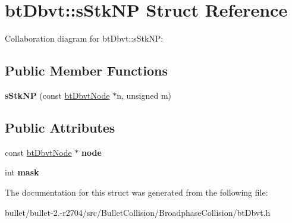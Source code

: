 \hypertarget{structbt_dbvt_1_1s_stk_n_p}{\section{bt\+Dbvt\+:\+:s\+Stk\+N\+P Struct Reference}
\label{structbt_dbvt_1_1s_stk_n_p}
}


Collaboration diagram for bt\+Dbvt\+:\+:s\+Stk\+N\+P\+:
\subsection*{Public Member Functions}
\begin{DoxyCompactItemize}
\item 
\hypertarget{structbt_dbvt_1_1s_stk_n_p_a779083781a038c4765d2380803386742}{{\bfseries s\+Stk\+N\+P} (const \hyperlink{structbt_dbvt_node}{bt\+Dbvt\+Node} $\ast$n, unsigned m)}\label{structbt_dbvt_1_1s_stk_n_p_a779083781a038c4765d2380803386742}

\end{DoxyCompactItemize}
\subsection*{Public Attributes}
\begin{DoxyCompactItemize}
\item 
\hypertarget{structbt_dbvt_1_1s_stk_n_p_a624f585fbdbe7c557c8e6d391e92c29d}{const \hyperlink{structbt_dbvt_node}{bt\+Dbvt\+Node} $\ast$ {\bfseries node}}\label{structbt_dbvt_1_1s_stk_n_p_a624f585fbdbe7c557c8e6d391e92c29d}

\item 
\hypertarget{structbt_dbvt_1_1s_stk_n_p_ae1c9afcd5531c3868cf22724da51341f}{int {\bfseries mask}}\label{structbt_dbvt_1_1s_stk_n_p_ae1c9afcd5531c3868cf22724da51341f}

\end{DoxyCompactItemize}


The documentation for this struct was generated from the following file\+:\begin{DoxyCompactItemize}
\item 
bullet/bullet-\/2.-\/r2704/src/\+Bullet\+Collision/\+Broadphase\+Collision/bt\+Dbvt.\+h\end{DoxyCompactItemize}
